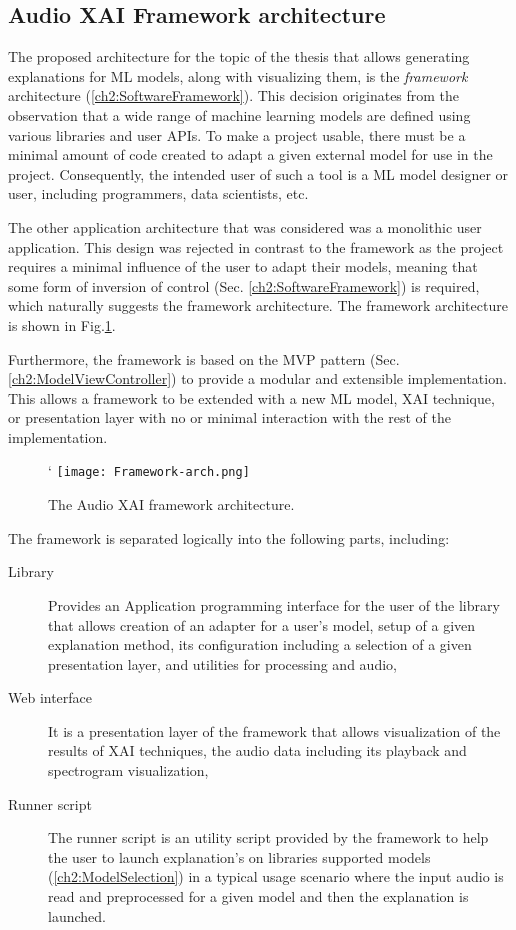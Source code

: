 \documentclass[
    bindingoffset=5mm,  %
    footnoteindent=3mm, %
    hyphenation=true    %
]{src/wut-thesis}
\begin{document}
\subsection{Audio XAI Framework architecture} \label{ch2:ArchitectureOverview}

The proposed architecture for the topic of the thesis that allows generating explanations for ML models,
along with visualizing them, is the \emph{framework} architecture (\ref{ch2:SoftwareFramework}).
This decision originates from the observation that a wide range of machine learning models are
defined using various libraries and user APIs. To make a project usable, there must be a minimal
amount of code created to adapt a given external model for use in the project.
Consequently, the intended user of such a tool is a ML model designer or user, including programmers,
data scientists, etc.

The other application architecture that was considered was a monolithic user
application. This design was rejected in contrast to the framework as the project
requires a minimal influence of the user to adapt their models,
meaning that some form of inversion of control (Sec. \ref{ch2:SoftwareFramework}) is required, which
naturally suggests the framework architecture.
The framework architecture is shown in Fig.\ref{fig:FrameworkArch}.

Furthermore, the framework is based on the MVP pattern (Sec. \ref{ch2:ModelViewController})
to provide a modular and extensible implementation. This allows a framework to be extended
with a new ML model, XAI technique, or presentation layer with no or minimal interaction
with the rest of the implementation.

\begin{figure}%
    \centering`
    \texttt{[image: Framework-arch.png]}
    \caption{The Audio XAI framework architecture.}
    \label{fig:FrameworkArch}
\end{figure}

The framework is separated logically into the following parts, including:
\begin{description}
    \item[Library] Provides an Application programming interface for the user
        of the library that allows creation of an adapter for a user's model,
        setup of a given explanation method, its configuration
        including a selection of a given presentation layer, and utilities for processing and audio,
    \item[Web interface] It is a presentation layer of the framework that allows visualization
        of the results of XAI techniques, the audio data including its playback and spectrogram
        visualization,
    \item[Runner script] The runner script is an utility script provided by the framework
        to help the user to launch explanation's on libraries supported models (\ref{ch2:ModelSelection})
        in a typical usage scenario where the input audio is read and preprocessed for
        a given model and then the explanation is launched.
\end{description}
\end{document}
